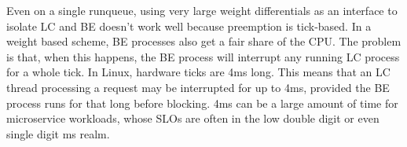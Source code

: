Even on a single runqueue, using very large weight differentials as an interface
to isolate LC and BE doesn't work well because preemption is tick-based. In a
weight based scheme, BE processes also get a fair share of the CPU. The problem
is that, when this happens, the BE process will interrupt any running LC process
for a whole tick. In Linux, hardware ticks are 4ms long. This means that an LC
thread processing a request may be interrupted for up to 4ms, provided the BE
process runs for that long before blocking. 4ms can be a large amount of time
for microservice workloads, whose SLOs are often in the low double digit or even
single digit ms realm.~\cite{in-the-plex, sigmaos}



